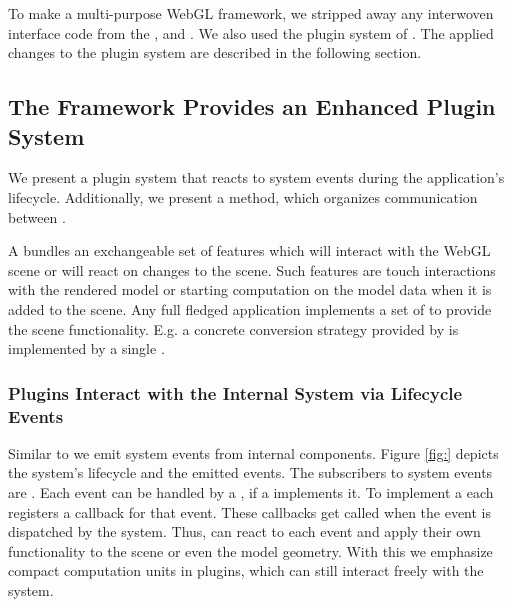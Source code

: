 \documentclass[../ClassicThesis.tex]{subfiles}
\begin{document}
To make {\convertify} a multi-purpose WebGL framework, we stripped
away any interwoven interface code from the ,
 and . We also used the plugin
system of {\brickify}. The applied changes to the plugin system are
described in the following section.

\subsection{The Framework Provides an Enhanced Plugin System}
\label{sec:plugin-system}


We present a plugin system that reacts to system events during the
application's lifecycle. Additionally, we present a method, which organizes
communication between .


A  bundles an exchangeable set of features which will
interact with the WebGL scene or will react on changes to the scene.
Such features are touch interactions with the rendered model or
starting computation on the model data when it is added to the
scene. Any full fledged application implements a set of
 to provide the scene functionality. E.g. a concrete
conversion strategy provided by {\platener} is implemented by a
single .

\subsubsection{Plugins Interact with the Internal System via
  Lifecycle Events}


Similar to {\brickify} we emit system events from internal components.
Figure \ref{fig:} depicts the
system's lifecycle and the emitted events. The subscribers to system
events are . Each event can be handled by a
, if a  implements it. To implement a
 each  registers a callback for that
event. These callbacks get called when the event is dispatched by the
system. Thus,  can react to each event and apply their
own functionality to the scene or even the model geometry. With this
we emphasize compact computation units in plugins, which can still
interact freely with the system.
\end{document}
